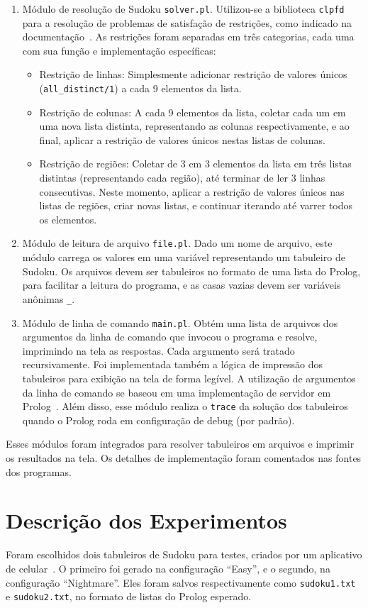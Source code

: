 \documentclass[journal,transmag]{IEEEtran}
\begin{document}
\begin{enumerate}
\item Módulo de resolução de Sudoku \texttt{solver.pl}. Utilizou-se a biblioteca
\texttt{clpfd} para a resolução de problemas de satisfação de restrições, como
indicado na documentação~\cite{clp}. As restrições foram separadas em três
categorias, cada uma com sua função e implementação específicas:
\begin{itemize}
\item Restrição de linhas: Simplesmente adicionar restrição de valores únicos 
(\texttt{all\_distinct/1}) a cada 9 elementos da lista.
\item Restrição de colunas: A cada 9 elementos da lista, coletar cada um em uma
nova lista distinta, representando as colunas respectivamente, e ao final,
aplicar a restrição de valores únicos nestas listas de colunas.
\item Restrição de regiões: Coletar de 3 em 3 elementos da lista em três listas
distintas (representando cada região), até terminar de ler 3 linhas
consecutivas. Neste momento, aplicar a restrição de valores únicos nas listas de
regiões, criar novas listas, e continuar iterando até varrer todos os elementos.
\end{itemize}
\item Módulo de leitura de arquivo \texttt{file.pl}. Dado um nome de arquivo,
este módulo carrega os valores em uma variável representando um tabuleiro de
Sudoku. Os arquivos devem ser tabuleiros no formato de uma lista do Prolog, para
facilitar a leitura do programa, e as casas vazias devem ser variáveis anônimas
\texttt{\_}.
\item Módulo de linha de comando \texttt{main.pl}. Obtém uma lista de arquivos
dos argumentos da linha de comando que invocou o programa e resolve, imprimindo
na tela as respostas. Cada argumento será tratado recursivamente. Foi
implementada também a lógica de impressão dos tabuleiros para exibição na tela
de forma legível. A utilização de argumentos da linha de comando se baseou em
uma implementação de servidor em Prolog~\cite{server}. Além disso, esse módulo
realiza o \texttt{trace} da solução dos tabuleiros quando o Prolog roda em
configuração de debug (por padrão).
\end{enumerate}

Esses módulos foram integrados para resolver tabuleiros em arquivos e imprimir
os resultados na tela. Os detalhes de implementação foram comentados nas fontes
dos programas.


\section{Descrição dos Experimentos}
Foram escolhidos dois tabuleiros de Sudoku para testes, criados por um
aplicativo de celular~\cite{app}. O primeiro foi gerado na configuração
``Easy'', e o segundo, na configuração ``Nightmare''. Eles foram salvos
respectivamente como \texttt{sudoku1.txt} e \texttt{sudoku2.txt}, no formato de
listas do Prolog esperado.
\end{document}
